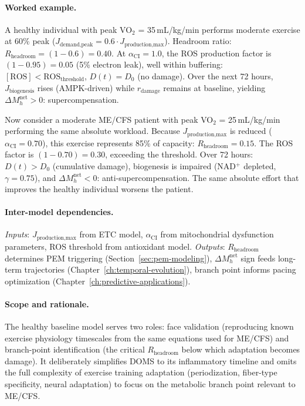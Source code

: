 \paragraph{Worked example.}
A healthy individual with peak VO$_2$ = 35\,mL/kg/min performs moderate exercise at 60\% peak ($J_{\text{demand,peak}} = 0.6 \cdot J_{\text{production,max}}$). Headroom ratio: $R_{\text{headroom}} = (1 - 0.6) = 0.40$. At $\alpha_{\text{CI}} = 1.0$, the ROS production factor is $(1 - 0.95) = 0.05$ (5\% electron leak), well within buffering: $[\text{ROS}] < \text{ROS}_{\text{threshold}}$, $D(t) = D_0$ (no damage). Over the next 72 hours, $J_{\text{biogenesis}}$ rises (AMPK-driven) while $r_{\text{damage}}$ remains at baseline, yielding $\Delta M_h^{\text{net}} > 0$: supercompensation.

Now consider a moderate ME/CFS patient with peak VO$_2$ = 25\,mL/kg/min performing the same absolute workload. Because $J_{\text{production,max}}$ is reduced ($\alpha_{\text{CI}} = 0.70$), this exercise represents 85\% of capacity: $R_{\text{headroom}} = 0.15$. The ROS factor is $(1 - 0.70) = 0.30$, exceeding the threshold. Over 72 hours: $D(t) > D_0$ (cumulative damage), biogenesis is impaired (NAD$^+$ depleted, $\gamma = 0.75$), and $\Delta M_h^{\text{net}} < 0$: anti-supercompensation. The same absolute effort that improves the healthy individual worsens the patient.

\paragraph{Inter-model dependencies.}
\emph{Inputs}: $J_{\text{production,max}}$ from ETC model, $\alpha_{\text{CI}}$ from mitochondrial dysfunction parameters, ROS threshold from antioxidant model. \emph{Outputs}: $R_{\text{headroom}}$ determines PEM triggering (Section~\ref{sec:pem-modeling}), $\Delta M_h^{\text{net}}$ sign feeds long-term trajectories (Chapter~\ref{ch:temporal-evolution}), branch point informs pacing optimization (Chapter~\ref{ch:predictive-applications}).

\paragraph{Scope and rationale.}
The healthy baseline model serves two roles: face validation (reproducing known exercise physiology timescales from the same equations used for ME/CFS) and branch-point identification (the critical $R_{\text{headroom}}$ below which adaptation becomes damage). It deliberately simplifies DOMS to its inflammatory timeline and omits the full complexity of exercise training adaptation (periodization, fiber-type specificity, neural adaptation) to focus on the metabolic branch point relevant to ME/CFS.

